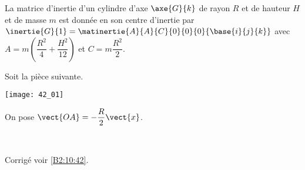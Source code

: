\normaltrue \difficilefalse \tdifficilefalse
\correctionfalse


\setcounter{question}{0}
\ifcorrection
\else
{}
\fi

\ifprof
\else

La matrice d'inertie d'un cylindre d'axe $\axe{G}{k}$ de rayon $R$ et de hauteur $H$ et de masse $m$ est donnée en son centre d'inertie par 
$\inertie{G}{1}=\matinertie{A}{A}{C}{0}{0}{0}{\base{i}{j}{k}}$ avec $A=m\left(\dfrac{R^2}{4}+\dfrac{H^2}{12} \right)$ et $C=m\dfrac{R^2}{2}$. 


Soit la pièce suivante. 
\begin{marginfigure}
\centering
\texttt{[image: 42\_01]}
\end{marginfigure}

On pose $\vect{OA}=-\dfrac{R}{2}\vect{x}$.

\fi


\ifprof
\else
\fi

\ifprof ~\\
\else
\fi


\ifprof
\else
\begin{flushright}
\footnotesize{Corrigé voir \ref{B2:10:42}.}
\end{flushright}%
\fi